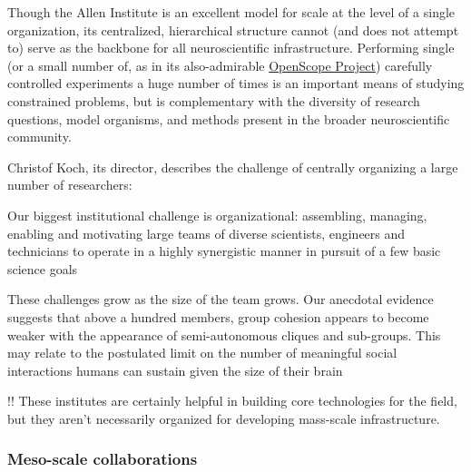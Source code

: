 \documentclass[10pt]{article}
\begin{document}
\begin{multicols}{2}
Though the Allen Institute is an excellent model for scale at the level
of a single organization, its centralized, hierarchical structure cannot
(and does not attempt to) serve as the backbone for all neuroscientific
infrastructure. Performing single (or a small number of, as in its
also-admirable
\href{https://alleninstitute.org/what-we-do/brain-science/news-press/articles/three-collaborative-studies-launch-openscope-shared-observatory-neuroscience}{OpenScope
Project}) carefully controlled experiments a huge number of times is an
important means of studying constrained problems, but is complementary
with the diversity of research questions, model organisms, and methods
present in the broader neuroscientific community.

Christof Koch, its director, describes the challenge of centrally
organizing a large number of researchers:

\begin{leftbar}
Our biggest institutional challenge is organizational: assembling,
managing, enabling and motivating large teams of diverse scientists,
engineers and technicians to operate in a highly synergistic manner in
pursuit of a few basic science goals \cite{grillnerWorldwideInitiativesAdvance2016} 
\end{leftbar}

\begin{leftbar}
These challenges grow as the size of the team grows. Our anecdotal
evidence suggests that above a hundred members, group cohesion appears
to become weaker with the appearance of semi-autonomous cliques and
sub-groups. This may relate to the postulated limit on the number of
meaningful social interactions humans can sustain given the size of
their brain \cite{kochBigScienceTeam2016} 
\end{leftbar}

!! These institutes are certainly helpful in building core technologies
for the field, but they aren't necessarily organized for developing
mass-scale infrastructure.

\hypertarget{meso-scale-collaborations}{%
\subsubsection{Meso-scale
collaborations}\label{meso-scale-collaborations}}


\end{multicols}
\end{document}
